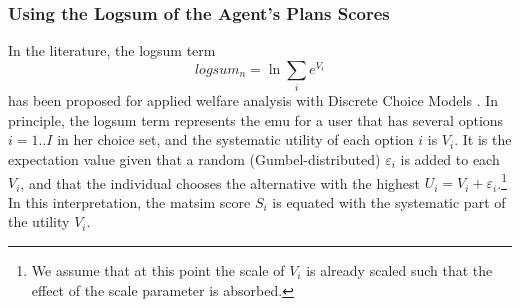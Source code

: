 \subsubsection{Using the Logsum of the Agent's Plans Scores}
\label{ch:economicEval:valuingBehavior:output2Eval:logsum}
In the literature, the logsum term 
\[
logsum_n = \ln \sum_i e^{V_i}
\]
has been proposed for applied welfare analysis with Discrete Choice Models \citep{SmallRosen1981AppliedWelfareEconomics, deJongDalyEtAl2006logsum, KohliDaly2006LogsumEvalPRISM, deJongEtAl2007LogsumTRA}.
%
%
In principle, the logsum term represents the \gls{emu} for a user that has several options $i=1..I$ in her choice set, and the systematic utility of each option $i$ is $V_i$.
%
It is the expectation value given that a random (Gumbel-distributed) $\varepsilon_i$ is added to each $V_i$, and that the individual chooses the alternative with the highest $U_i = V_i + \varepsilon_i$.\footnote{%
%
We assume that at this point the scale of $V_i$ is already scaled such that the effect of the scale parameter is absorbed.
%
} In this interpretation, the \acrshort{matsim} score $S_i$ is equated with the systematic part of the utility $V_i$.




